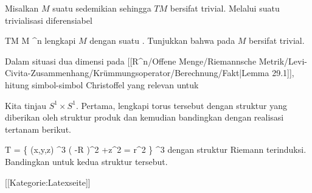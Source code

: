 \setcounter{section}{29}


{}
{

Misalkan $M$ suatu
sedemikian sehingga
$TM$ bersifat trivial. Melalui suatu trivialisasi diferensiabel

\mavergleichskette
{\vergleichskette
{ TM
}
{ \cong }{ M \times \R^n
}
{  }{
}
{    }{
}
{   }{
}
}
{}{}{}
lengkapi $M$
 {} {}
dengan suatu
 {} {.}
Tunjukkan bahwa
pada $M$ bersifat trivial.

}
{} {}

{}
{

Dalam situasi dua dimensi pada
[[R^n/Offene Menge/Riemannsche Metrik/Levi-Civita-Zusammenhang/Krümmungsoperator/Berechnung/Fakt|Lemma 29.1]],
hitung simbol-simbol Christoffel yang relevan untuk

}
{} {}

{}
{

Kita tinjau
$S^1 \times S^1$. Pertama, lengkapi torus tersebut dengan struktur yang diberikan oleh struktur produk
 {} {}
dan
kemudian bandingkan dengan realisasi tertanam berikut.

\mavergleichskettedisp
{\vergleichskette
{ T
}
{ =} { \left\{ (x,y,z) \in \R^3  \mid   \left(   -R  \right)^2 +z^2  = r^2         \right\}
}
{ \subseteq} { \R^3
}
{ } {
}
{ } {
}
}
{}{}{}
dengan struktur Riemann terinduksi. Bandingkan
untuk kedua struktur tersebut.

}
{} {}


 [[Kategorie:Latexseite]]
